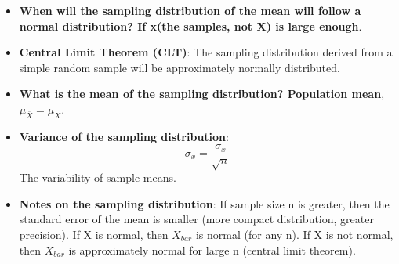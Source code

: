 \documentclass[12pt]{book}
\begin{document}
\begin{itemize}
\item \textbf{When will the sampling distribution of the mean will follow a normal distribution? If x(the samples, not X) is large enough}.
\item \textbf{Central Limit Theorem (CLT)}: The sampling distribution derived from a simple random sample will be approximately normally distributed.
\item \textbf{What is the mean of the sampling distribution? Population mean}, \textbf{$\mu_{\bar{X}} = \mu_X$}.
\item \textbf{Variance of the sampling distribution}: $$\sigma_{\bar{x}} = \frac{\sigma_x}{\sqrt{n}}$$
The variability of sample means.
\item \textbf{Notes on the sampling distribution}: If sample size n is greater, then the standard error of the mean is smaller (more compact distribution, greater precision). If X is normal, then $X_{bar}$ is normal (for any n). If X is not normal, then $X_{bar}$ is approximately normal for large n (central limit theorem).
\end{itemize}



\newpage

\graphicspath{{./regressionPic/}}
\pagestyle{fancy}
\end{document}
